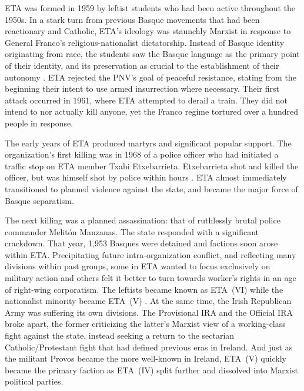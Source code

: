 \documentclass[basque,american]{../../../coursework}
\begin{document}
ETA was formed in 1959 by leftist students who had been active throughout the
1950s. In a stark turn from previous Basque movements that had been
reactionary and Catholic, ETA's ideology was staunchly Marxist in response to
General Franco's religious-nationalist dictatorship. Instead of Basque
identity originating from race, the students saw the Basque language as the
primary point of their identity, and its preservation as crucial to the
establishment of their autonomy \parencite[15]{Muroa2017}. ETA rejected the
PNV's goal of peaceful resistance, stating from the beginning their intent to
use armed insurrection where necessary. Their first attack occurred in 1961,
where ETA attempted to derail a train. They did not intend to nor actually
kill anyone, yet the Franco regime tortured over a hundred people in response.

The early years of ETA produced martyrs and significant popular support. The
organization's first killing was in 1968 of a police officer who had initiated
a traffic stop on ETA member Txabi Etxebarrieta. Etxebarrieta shot and killed
the officer, but was himself shot by police within hours
\parencite[17]{Muroa2017}. ETA almost immediately transitioned to planned
violence against the state, and became the major force of Basque separatism.

The next killing was a planned assassination: that of ruthlessly brutal police
commander Melitón Manzanas. The state responded with a significant crackdown.
That year, 1,953 Basques were detained \parencite[43]{Whitfield2014} and
factions soon arose within ETA. Precipitating future intra-organization
conflict, and reflecting many divisions within past groups, some in ETA wanted
to focus exclusively on military action and others felt it better to turn
towards worker's rights in an age of right-wing corporatism. The leftists
became known as ETA~(VI) while the nationalist minority became ETA~(V)
\parencite[18]{Muroa2017}. At the same time, the Irish Republican Army was
suffering its own divisions. The Provisional IRA and the Official IRA broke
apart, the former criticizing the latter's Marxist view of a working-class
fight against the state, instead seeking a return to the sectarian
Catholic/Protestant fight that had defined previous eras in Ireland. And just
as the militant Provos became the more well-known in Ireland, ETA~(V) quickly
became the primary faction as ETA~(IV) split further and dissolved into
Marxist political parties.
\end{document}
